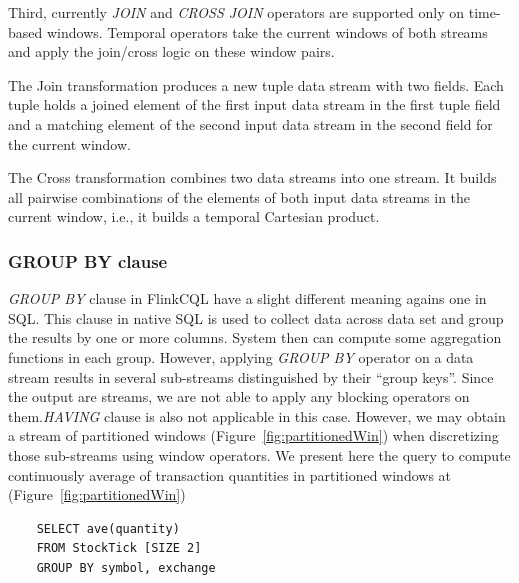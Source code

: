 Third, currently \textit{JOIN} and \textit{CROSS JOIN} operators are supported only on time-based windows. Temporal operators take the current windows of both streams and apply the join/cross logic on these window pairs.

The Join transformation produces a new tuple data stream with two fields. Each tuple holds a joined element of the first input data stream in the first tuple field and a matching element of the second input data stream in the second field for the current window.

The Cross transformation combines two data streams into one stream. It builds all pairwise combinations of the elements of both input data streams in the current window, i.e., it builds a temporal Cartesian product.


\subsubsection*{GROUP BY clause}
\textit{GROUP BY} clause in FlinkCQL have a slight different meaning agains one in SQL. This clause in native SQL is used to collect data across data set and group the results by one or more columns. System then can compute some aggregation functions in each group. However, applying \textit{GROUP BY} operator on a data stream results in several sub-streams distinguished by their ``group keys''. Since the output are streams, we are not able to apply any blocking operators on them.\textit{HAVING} clause is also not applicable in this case. However,  we may obtain a stream of partitioned windows (Figure~\ref{fig:partitionedWin}) when discretizing those sub-streams using window operators. We present here the query to compute continuously average of transaction quantities in partitioned windows at  (Figure~\ref{fig:partitionedWin})
\begin{lstlisting}
	SELECT ave(quantity)
	FROM StockTick [SIZE 2]
	GROUP BY symbol, exchange
\end{lstlisting}


